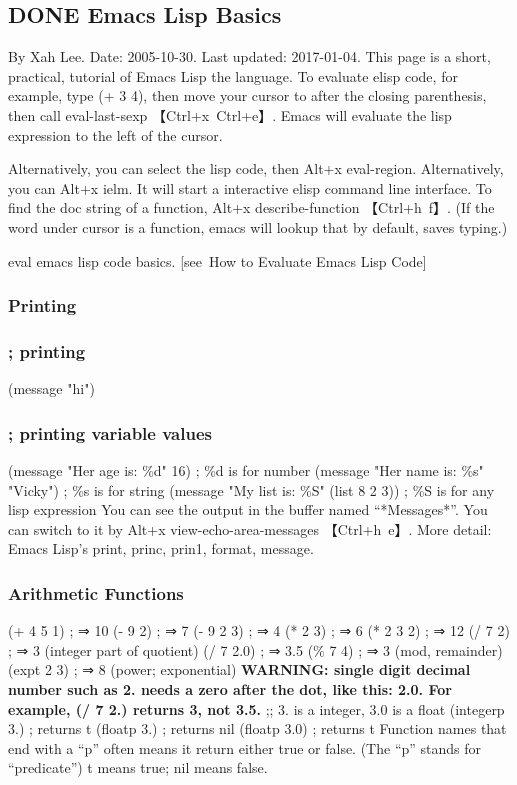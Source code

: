 \documentclass[11pt]{ctexart}
\begin{document}
{{{{\subsection{{\bfseries\sffamily DONE} Emacs Lisp Basics}
\label{sec:orgeb07682}
By Xah Lee. Date: 2005-10-30. Last updated: 2017-01-04.
This page is a short, practical, tutorial of Emacs Lisp the language.
To evaluate elisp code, for example, type (+ 3 4), then move your cursor to
after the closing parenthesis, then call eval-last-sexp 【Ctrl+x Ctrl+e】. Emacs
will evaluate the lisp expression to the left of the cursor.

Alternatively, you can select the lisp code, then Alt+x eval-region.
Alternatively, you can Alt+x ielm. It will start a interactive elisp command line interface.
To find the doc string of a function, Alt+x describe-function 【Ctrl+h f】. (If
the word under cursor is a function, emacs will lookup that by default, saves
typing.)


eval emacs lisp code basics. [see How to Evaluate Emacs Lisp Code]
\subsubsection{Printing}
\label{sec:orgfe0cb76}
\subsubsection{; printing}
\label{sec:org984a536}
(message "hi")

\subsubsection{; printing variable values}
\label{sec:org96aca1c}
(message "Her age is: \%d" 16)        ; \%d is for number
(message "Her name is: \%s" "Vicky")  ; \%s is for string
(message "My list is: \%S" (list 8 2 3))  ; \%S is for any lisp expression
You can see the output in the buffer named “*Messages*”. You can switch to it by Alt+x view-echo-area-messages 【Ctrl+h e】.
More detail: Emacs Lisp's print, princ, prin1, format, message.
\subsubsection{Arithmetic Functions}
\label{sec:org68afb49}
(+ 4 5 1)     ;    ⇒ 10
(- 9 2)       ;    ⇒  7
(- 9 2 3)     ;    ⇒  4
(* 2 3)       ;    ⇒  6
(* 2 3 2)     ;    ⇒ 12
(/ 7 2)       ;    ⇒  3 (integer part of quotient)
(/ 7 2.0)     ;    ⇒  3.5
(\% 7 4)       ;    ⇒  3 (mod, remainder)
(expt 2 3)    ;    ⇒ 8 (power; exponential)
\textbf{WARNING: single digit decimal number such as 2. needs a zero after the dot, like this: 2.0. For example, (/ 7 2.) returns 3, not 3.5.}
;; 3. is a integer, 3.0 is a float
(integerp 3.) ; returns t
(floatp 3.) ; returns nil
(floatp 3.0) ; returns t
Function names that end with a “p” often means it return either true or false. (The “p” stands for “predicate”) t means true; nil means false.
}}}}
\end{document}
